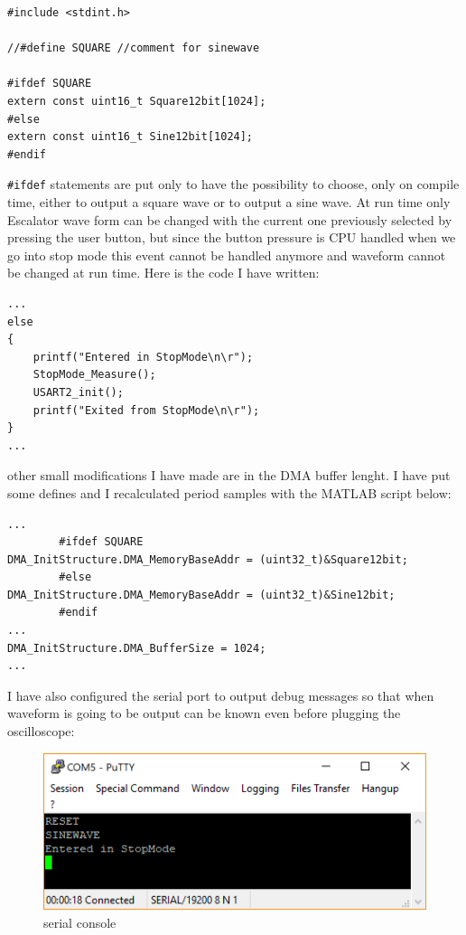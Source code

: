 \documentclass[peerreview]{IEEEtran}
\begin{document}
\begin{lstlisting}[style=CStyle]
#include <stdint.h>

//#define SQUARE //comment for sinewave

#ifdef SQUARE
extern const uint16_t Square12bit[1024];
#else
extern const uint16_t Sine12bit[1024];
#endif
\end{lstlisting}
\lstinline[style=CStyle]{#ifdef} statements are put only to have the possibility to choose, only on compile time, either to output a square wave or to output a sine wave. At run time only Escalator wave form can be changed with the current one previously selected by pressing the user button, but since the button pressure is CPU handled when we go into stop mode this event cannot be handled anymore and waveform cannot be changed at run time. Here is the code I have written:
\begin{lstlisting}[style=CStyle]
...
else
{
	printf("Entered in StopMode\n\r");
	StopMode_Measure();
	USART2_init();
	printf("Exited from StopMode\n\r");
}
...
\end{lstlisting}
other small modifications I have made are in the DMA buffer lenght. I have put some defines and I recalculated period samples with the MATLAB script below:
\begin{lstlisting}[style=CStyle]
...
		#ifdef SQUARE
DMA_InitStructure.DMA_MemoryBaseAddr = (uint32_t)&Square12bit;
		#else
DMA_InitStructure.DMA_MemoryBaseAddr = (uint32_t)&Sine12bit;
		#endif
...
DMA_InitStructure.DMA_BufferSize = 1024;
...
\end{lstlisting}
I have also configured the serial port to output debug messages so that when waveform is going to be output can be known even before plugging the oscilloscope:
\begin{figure}[!ht]
\centering
\includegraphics[width=0.8\columnwidth]{serial} 
\caption{serial console}
\label{fig_ser}
\end{figure}
\end{document}
